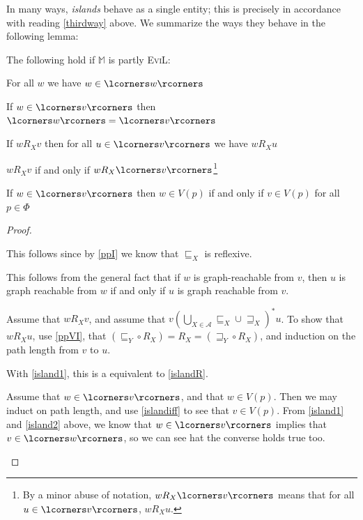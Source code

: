In many ways, \emph{islands} behave as a single entity;  this is
precisely in accordance with reading \ref{thirdway} above.
We summarize the ways they behave in the following lemma:
\pagebreak
\begin{lemma}\label{island}
The following hold if $\mathbb{M}$ is partly \textsc{EviL}:
\begin{mynum}
	\item\label{island1} For all $w$ we have $w \in \lcorners w\rcorners$
	\item\label{island2} If $w \in \lcorners v\rcorners$ then $\lcorners w\rcorners = \lcorners v\rcorners$
	\item \label{islandR} If $w R_X v$ then for all $u \in \lcorners v\rcorners$
          we have $w R_X u$
\item \label{islandR2} $w R_X v$ if and only if $w R_X \lcorners v
  \rcorners$\footnote{By a minor abuse of notation, 
 $w R_X \lcorners
     v\rcorners$ means that for all $u \in \lcorners v \rcorners$, $w
     R_X u$.
}
	\item \label{islandletters} If $w \in \lcorners v\rcorners$ then $w\in V(p)$ if and only if $v \in V(p)$ for all $p \in \Phi$
\end{mynum}
\end{lemma}
\begin{proof} \ \\
\begin{mynum}
\item This follows since by \ref{ppI} we know that $\sqsubseteq_X$ is
  reflexive.
\item This follows from the general fact that if $w$ is graph-reachable from
  $v$, then $u$ is graph reachable from $w$ if and only if $u$ is
  graph reachable from $v$.
\item Assume that $w R_X v$, and assume that $v \left(\bigcup_{X \in
      \mathcal{A}} \sqsubseteq_X \cup \sqsupseteq_X \right)^\ast u$.
  To show that $w R_X u$, use \ref{ppVI}, that $(\sqsubseteq_Y \circ R_X) = R_X =
    (\sqsupseteq_Y \circ R_X)$, and induction on the path length from
    $v$ to $u$.
\item With \ref{island1}, this is a equivalent to \ref{islandR}.
\item Assume that $w \in \lcorners v \rcorners$, and that $w \in
  V(p)$.  Then we may induct on path length, and use \ref{islandiff}
  to see that $v \in V(p)$.  From \ref{island1} and \ref{island2}
  above, we know that $w \in \lcorners v \rcorners$ implies that $v
  \in \lcorners w \rcorners$, so we can see hat the converse holds
  true too.
\end{mynum}
\end{proof}

